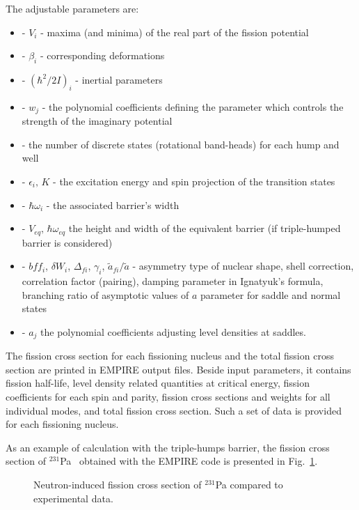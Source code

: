 \documentclass[twocolumn,amsmath,amssymb,10pt,groupedaddress,a4paper]{revtex4}
\begin{document}
The adjustable parameters are:
\begin{itemize}
\item - $V_{i}$ - maxima (and minima) of the real part of the fission potential
\item - $\beta_{i}$ - corresponding deformations
\item - $(\hbar^{2}/2I)_{i}$ - inertial parameters
\item - $w_{j}$ - the polynomial coefficients defining the parameter which
controls the strength of the imaginary potential
\item - the number of discrete states (rotational band-heads) for each hump
and well
\item - $\epsilon_{i},\, K$ - the excitation energy and spin projection
of the transition states
\item - $\hbar\omega_{i}$ - the associated barrier's width
\item - $V_{eq},\,\hbar\omega_{eq}$ the height and width of the equivalent
barrier (if triple-humped barrier is considered)
\item - $bff_{i}$, $\delta W_{i}$, $\Delta_{fi}$, $\gamma_{i}$, $\tilde{a}_{fi}/\tilde{a}$
- asymmetry type of nuclear shape, shell correction, correlation factor
(pairing), damping parameter in Ignatyuk's formula, branching ratio
of asymptotic values of $a$ parameter for saddle and normal states
\item - $a_{j}$ the polynomial coefficients adjusting level densities at
saddles.
\end{itemize}
The fission cross section for each fissioning nucleus and the total
fission cross section are printed in EMPIRE output files.
 Beside input parameters, it contains
fission half-life, level density related quantities at critical energy,
 fission coefficients for each spin and parity, fission
cross sections and weights for all individual modes, and total fission
cross section. Such a set of data is provided for each fissioning
nucleus.

As an example of calculation with the triple-humps barrier, the fission cross
section of $^{231}$Pa~\cite{sin01} obtained with the EMPIRE code is presented
in Fig.~\ref{pa231}.
\begin{figure}[htbp]
\caption{\label{pa231}Neutron-induced fission cross section of $^{231}$Pa compared to
experimental data.}
\end{figure}
\end{document}
